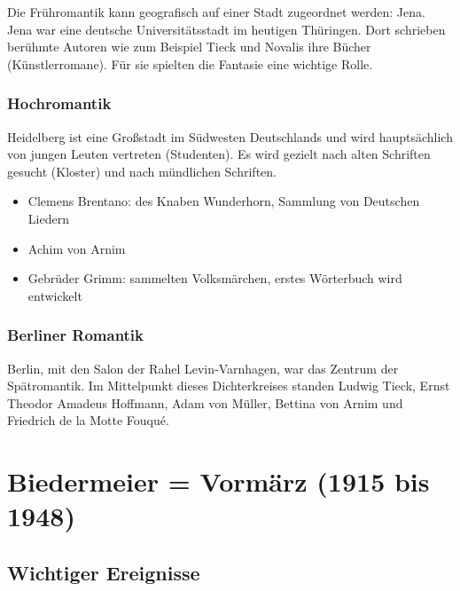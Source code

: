 \documentclass[12pt,a4paper]{article}
\begin{document}
Die Frühromantik kann geografisch auf einer Stadt zugeordnet werden: Jena. Jena war eine deutsche Universitätsstadt im heutigen Thüringen. Dort schrieben berühmte Autoren wie zum Beispiel Tieck und Novalis ihre Bücher (Künstlerromane). Für sie spielten die Fantasie eine wichtige Rolle.

\subsubsection{Hochromantik}

Heidelberg ist eine Großstadt im Südwesten Deutschlands und wird hauptsächlich von jungen Leuten vertreten (Studenten). Es wird gezielt nach alten Schriften gesucht (Kloster) und nach mündlichen Schriften.

\begin{itemize}
\item Clemens Brentano: des Knaben Wunderhorn, Sammlung von Deutschen Liedern
\item Achim von Arnim
\item Gebrüder Grimm: sammelten Volksmärchen, erstes Wörterbuch wird entwickelt
\end{itemize}

\subsubsection{Berliner Romantik}

Berlin, mit den Salon der Rahel Levin-Varnhagen, war das Zentrum der Spätromantik. Im Mittelpunkt dieses Dichterkreises standen Ludwig Tieck, Ernst Theodor Amadeus Hoffmann, Adam von Müller, Bettina von Arnim und Friedrich de la Motte Fouqué.

\newpage

\section{Biedermeier = Vormärz (1915 bis 1948)}

\subsection{Wichtiger Ereignisse}
\end{document}
